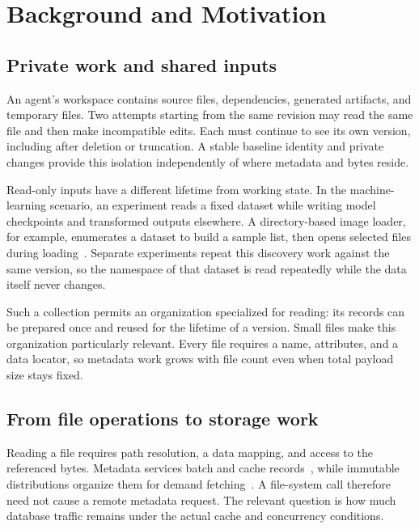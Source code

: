 \section{Background and Motivation}
\label{sec:motivation}

\subsection{Private work and shared inputs}

An agent's workspace contains source files, dependencies, generated
artifacts, and temporary files. Two attempts starting from the same
revision may read the same file and then make incompatible edits.
Each must continue to see its own version, including after deletion
or truncation. A stable baseline identity and private changes provide
this isolation independently of where metadata and bytes reside.

Read-only inputs have a different lifetime from working state. In the
machine-learning scenario, an experiment reads a fixed dataset while
writing model checkpoints and transformed outputs elsewhere. A
directory-based image loader, for example, enumerates a dataset to
build a sample list, then opens selected files during
loading~\cite{torchvision_folder}. Separate experiments repeat this
discovery work against the same version, so the namespace of that
dataset is read repeatedly while the data itself never changes.

Such a collection permits an organization specialized for reading:
its records can be prepared once and reused for the lifetime of a
version. Small files make this organization particularly relevant.
Every file requires a name, attributes, and a data locator, so metadata
work grows with file count even when total payload size stays fixed.

\subsection{From file operations to storage work}

Reading a file requires path resolution, a data mapping, and access
to the referenced bytes. Metadata services batch and cache
records~\cite{tablefs2013,indexfs2014}, while immutable distributions
organize them for demand fetching~\cite{cvmfs2011,nydus_rafs}. A
file-system call therefore need not cause a remote metadata request.
The relevant question is how much database traffic remains under the
actual cache and concurrency conditions.

